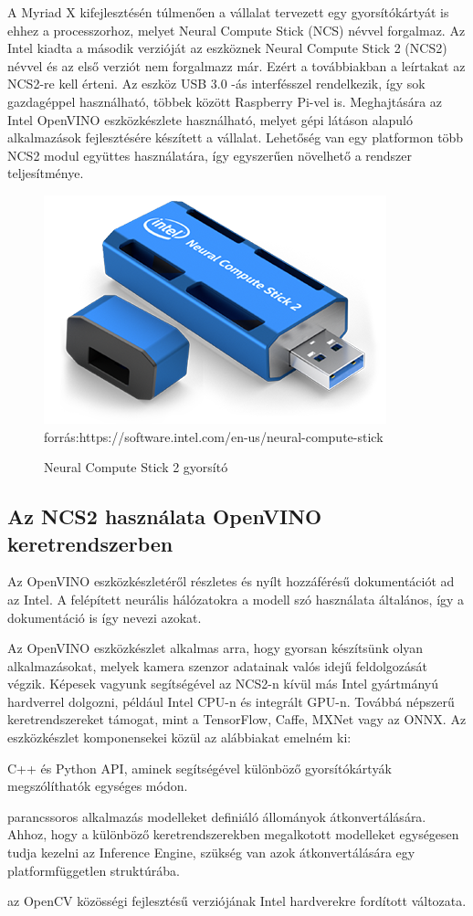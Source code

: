 A Myriad X kifejlesztésén túlmenően a vállalat tervezett egy gyorsítókártyát is ehhez a processzorhoz, melyet Neural Compute Stick (NCS) névvel forgalmaz. Az Intel kiadta a második verzióját az eszköznek  Neural Compute Stick 2 (NCS2) névvel és az első verziót nem forgalmazz már. Ezért a továbbiakban a leírtakat az NCS2-re kell érteni.
Az eszköz USB 3.0 -ás interfésszel rendelkezik, így sok gazdagéppel használható, többek között Raspberry Pi-vel is. Meghajtására az Intel OpenVINO eszközkészlete használható, melyet gépi látáson alapuló alkalmazások fejlesztésére készített a vállalat. Lehetőség van egy platformon több NCS2 modul együttes használatára, így egyszerűen növelhető a rendszer teljesítménye.
\begin{figure}[h]
	\centering
	\includegraphics[width=0.3\linewidth]{fig/NCS2-specs}\\
	\footnotesize forrás:https://software.intel.com/en-us/neural-compute-stick
	\caption{Neural Compute Stick 2 gyorsító} 
	\label{fig:ncs2-specs}
\end{figure}

\subsection{Az NCS2 használata OpenVINO keretrendszerben}
Az OpenVINO eszközkészletéről részletes és nyílt hozzáférésű dokumentációt ad az Intel. \cite{web:OpenVINO} A felépített neurális hálózatokra a modell szó használata általános, így a dokumentáció is így nevezi azokat.

Az OpenVINO eszközkészlet alkalmas arra, hogy gyorsan készítsünk olyan alkalmazásokat, melyek %
kamera szenzor adatainak valós idejű feldolgozását végzik. Képesek vagyunk segítségével az NCS2-n kívül más Intel gyártmányú hardverrel dolgozni, például Intel CPU-n és integrált GPU-n. Továbbá népszerű keretrendszereket támogat, mint a TensorFlow, Caffe, MXNet vagy az ONNX. Az eszközkészlet komponensekei közül az alábbiakat emelném ki:
\begin{description}[noitemsep]
	\item[Inference Engine] C++ és Python API, aminek segítségével különböző gyorsítókártyák megszólíthatók egységes módon.
	\item[Model Optimizer] parancssoros alkalmazás modelleket definiáló állományok átkonvertálására. Ahhoz, hogy a különböző keretrendszerekben megalkotott modelleket egységesen tudja kezelni az Inference Engine, szükség van azok átkonvertálására egy platformfüggetlen struktúrába.
	\item[OpenCV] az OpenCV közösségi fejlesztésű verziójának Intel hardverekre fordított változata.
\end{description}

